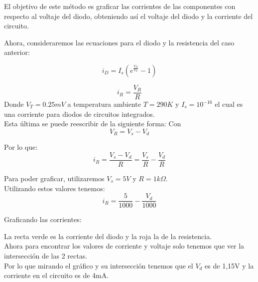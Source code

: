 \documentclass[11pt,fancy,lang=es]{elegantbook}
\begin{document}
\begin{remark}
    El objetivo de este método es graficar las corrientes de las componentes con respecto al voltaje del diodo, obteniendo así el voltaje del diodo y la corriente del circuito.\\
\end{remark}

Ahora, consideraremos las ecuaciones para el diodo y la resistencia del caso anterior:

\begin{equation*}
    i_D = I_s(e^{{\frac{V_D}{V_T}}}-1)
\end{equation*}

\begin{equation*}
    i_R = \frac{V_R}{R}
\end{equation*}
Donde $V_T = 0.25mV$ a temperatura ambiente $ T = 290K $ y $ I_s = 10^{-16}$ el cual es una corriente para diodos de circuitos integrados.\\

Esta última se puede reescribir de la siguiente forma:
Con\begin{equation*}
    V_R = V_s - V_d
\end{equation*}

Por lo que:
\begin{equation*}
    i_R = \frac{V_s - V_d}{R} = \frac{V_s}{R}- \frac{V_d}{R}
\end{equation*}

Para poder graficar, utilizaremos $V_s = 5V$ y $R= 1k\Omega$.\\

Utilizando estos valores tenemos:
\begin{equation*}
    i_R = \frac{5}{1000}- \frac{V_d}{1000}
\end{equation*}

\newpage
Graficando las corrientes:

\iffalse
\begin{figure}[!h]
    \centering
    \texttt{[image: image/metodoGrafico.png]}
    \caption{Gráfico $I$ vs $V_d$}
    \label{fig:my_label}
\end{figure}
\fi

La recta verde es la corriente del diodo y la roja la de la resistencia.\\
Ahora para encontrar los valores de corriente y voltaje solo tenemos que ver la intersección de las 2 rectas.\\

Por lo que mirando el gráfico y su intersección tenemos que el $V_d$ es de 1,15V y la corriente en el circuito es de 4mA.\\
\end{document}
